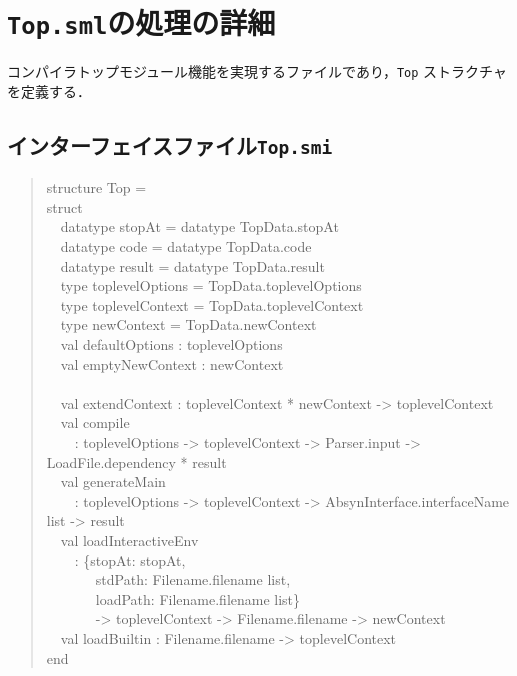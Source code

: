 \documentclass{jbook}
\newif\ifjp
\newcommand{\txt}[2]{#1}
\newcommand{\code}[1]{\mbox{\large\tt #1}}
\newcommand{\myem}{\mbox{\ \ }}
\newenvironment{program}{\begin{quote}\begin{tt}}%
                        {\end{tt}\end{quote}}
\begin{document}
\section{\txt{\code{Top.sml}の処理の詳細}{The details of \code{Top.sml}}}
\ifjp%

	コンパイラトップモジュール機能を実現するファイルであり，\code{Top}
ストラクチャを定義する．

\subsection{インターフェイスファイル\code{Top.smi}}
\begin{program}
structure Top =\\
struct\\
\myem   datatype stopAt = datatype TopData.stopAt\\
\myem   datatype code = datatype TopData.code\\
\myem   datatype result = datatype TopData.result\\
\myem   type toplevelOptions = TopData.toplevelOptions\\
\myem   type toplevelContext = TopData.toplevelContext\\
\myem   type newContext = TopData.newContext\\
\myem   val defaultOptions : toplevelOptions\\
\myem   val emptyNewContext : newContext\\
\\
\myem   val extendContext : toplevelContext * newContext -> toplevelContext\\
\myem   val compile \\
\myem\myem       : toplevelOptions -> toplevelContext -> Parser.input -> LoadFile.dependency * result\\
\myem   val generateMain\\
\myem\myem       : toplevelOptions -> toplevelContext -> AbsynInterface.interfaceName list -> result\\
\myem   val loadInteractiveEnv \\
\myem\myem       : \{stopAt: stopAt,\\
\myem\myem\myem\           stdPath: Filename.filename list,\\
\myem\myem\myem\          loadPath: Filename.filename list\}\\
\myem\myem\myem\          -> toplevelContext -> Filename.filename -> newContext\\
\myem   val loadBuiltin : Filename.filename -> toplevelContext\\
end
\end{program}
\end{document}
